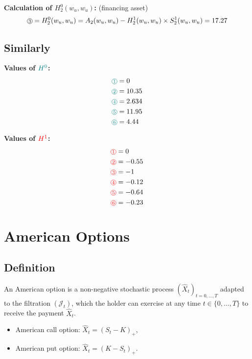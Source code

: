 \textbf{Calculation of $H_2^0(w_u, w_u)$:} (financing asset)
\[
\circled{3} = H_2^0(w_u, w_u) = A_2(w_u, w_u) - H_2^1(w_u, w_u) \times S_2^1(w_u, w_u) = 17.27
\]

\subsection*{Similarly}

\begin{minipage}{0.45\textwidth}
\textbf{Values of $\textcolor{teal}{H^0}$:}
\begin{align*}
\textcolor{teal}{\circled{1}} &= 0 \\
\textcolor{teal}{\circled{2}} &= 10.35 \\
\textcolor{teal}{\circled{4}} &= 2.634 \\
\textcolor{teal}{\circled{5}} &= 11.95 \\
\textcolor{teal}{\circled{6}} &= 4.44
\end{align*}
\end{minipage}
\hfill
\begin{minipage}{0.45\textwidth}
\textbf{Values of $\textcolor{red}{H^1}$:}
\begin{align*}
\textcolor{red}{\circled{1}} &= 0 \\
\textcolor{red}{\circled{2}} &= -0.55 \\
\textcolor{red}{\circled{3}} &= -1 \\
\textcolor{red}{\circled{4}} &= -0.12 \\
\textcolor{red}{\circled{5}} &= -0.64 \\
\textcolor{red}{\circled{6}} &= -0.23
\end{align*}
\end{minipage}

\section{American Options}

\subsection{Definition}

An American option is a non-negative stochastic process $(\hat{X}_t)_{t=0,\dots,T}$ adapted to the filtration $(\mathcal{J}_t)$, which the holder can exercise at any time $t\in\{0,\dots,T\}$ to receive the payment $\hat{X}_t$.

\begin{itemize}
    \item American call option: $\hat{X}_t = (S_t - K)_+$,
    \item American put option: $\hat{X}_t = (K - S_t)_+$.
\end{itemize}

